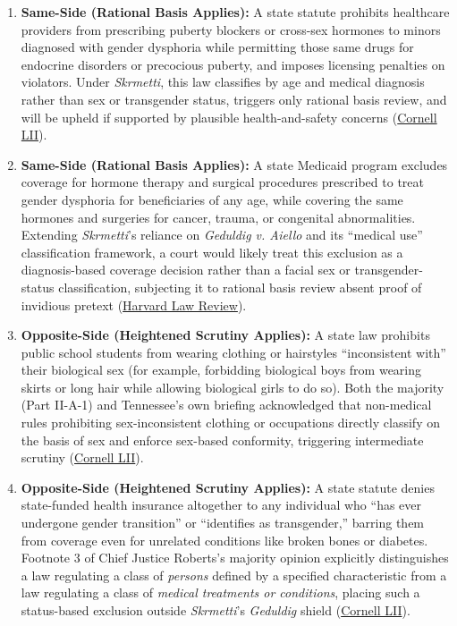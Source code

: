 \documentclass[12pt]{article}
\begin{document}
\begin{enumerate}
\item \textbf{Same-Side (Rational Basis Applies):} A state statute prohibits healthcare providers from prescribing puberty blockers or cross-sex hormones to minors diagnosed with gender dysphoria while permitting those same drugs for endocrine disorders or precocious puberty, and imposes licensing penalties on violators. Under \textit{Skrmetti}, this law classifies by age and medical diagnosis rather than sex or transgender status, triggers only rational basis review, and will be upheld if supported by plausible health-and-safety concerns (\href{https://www.law.cornell.edu/supremecourt/text/23-477}{Cornell LII}).
\item \textbf{Same-Side (Rational Basis Applies):} A state Medicaid program excludes coverage for hormone therapy and surgical procedures prescribed to treat gender dysphoria for beneficiaries of any age, while covering the same hormones and surgeries for cancer, trauma, or congenital abnormalities. Extending \textit{Skrmetti}'s reliance on \textit{Geduldig v. Aiello} and its ``medical use'' classification framework, a court would likely treat this exclusion as a diagnosis-based coverage decision rather than a facial sex or transgender-status classification, subjecting it to rational basis review absent proof of invidious pretext (\href{https://harvardlawreview.org/print/vol-139/skrmetti-beyond-scrutiny/}{Harvard Law Review}).
\item \textbf{Opposite-Side (Heightened Scrutiny Applies):} A state law prohibits public school students from wearing clothing or hairstyles ``inconsistent with'' their biological sex (for example, forbidding biological boys from wearing skirts or long hair while allowing biological girls to do so). Both the majority (Part II-A-1) and Tennessee's own briefing acknowledged that non-medical rules prohibiting sex-inconsistent clothing or occupations directly classify on the basis of sex and enforce sex-based conformity, triggering intermediate scrutiny (\href{https://www.law.cornell.edu/supremecourt/text/23-477}{Cornell LII}).
\item \textbf{Opposite-Side (Heightened Scrutiny Applies):} A state statute denies state-funded health insurance altogether to any individual who ``has ever undergone gender transition'' or ``identifies as transgender,'' barring them from coverage even for unrelated conditions like broken bones or diabetes. Footnote 3 of Chief Justice Roberts's majority opinion explicitly distinguishes a law regulating a class of \textit{persons} defined by a specified characteristic from a law regulating a class of \textit{medical treatments or conditions}, placing such a status-based exclusion outside \textit{Skrmetti}'s \textit{Geduldig} shield (\href{https://www.law.cornell.edu/supremecourt/text/23-477}{Cornell LII}).

\end{enumerate}
\end{document}
